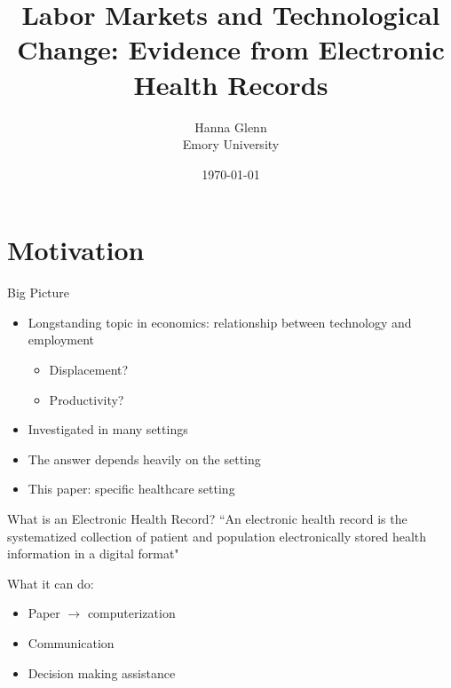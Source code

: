 \documentclass[10pt]{beamer}
\title{Labor Markets and Technological Change: Evidence from Electronic Health Records}
\subtitle{Hanna Glenn\\ \small Emory University}
\date{\today}
\begin{document}
\maketitle





\section[Motivation]{Motivation}

\begin{frame}{Big Picture}
\begin{itemize}
    \item Longstanding topic in economics: relationship between technology and employment
    \vspace{2mm}
    \begin{itemize}
        \item Displacement?
        \item Productivity?
    \end{itemize}
    \vspace{3mm}
    \item Investigated in many settings
    \vspace{3mm}
    \item The answer depends heavily on the setting
    \vspace{3mm}
    \item This paper: specific healthcare setting
\end{itemize}

\end{frame}

\begin{frame}[fragile]{What is an Electronic Health Record?}
``An electronic health record is the systematized collection of patient and population electronically stored health information in a digital format"

\vspace{3mm}

What it can do:
\begin{itemize}
    \item Paper $\rightarrow$ computerization
    \item Communication
    \item Decision making assistance
\end{itemize}

\end{frame}
\end{document}
